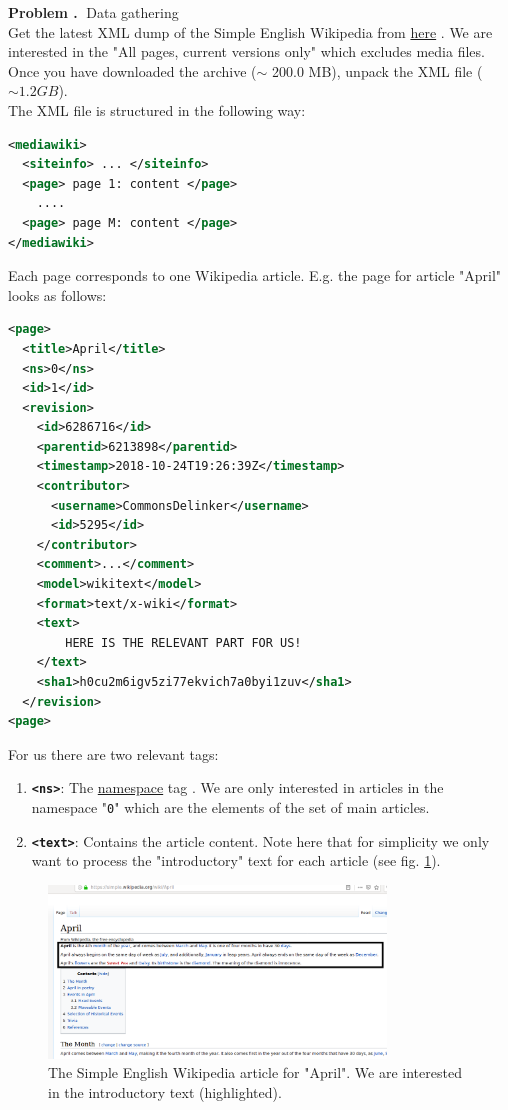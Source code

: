 \documentclass[10pt]{article}
\newcounter{problemCounter}
\newenvironment{problem}[1]
{
	\vspace{0.5cm}
	\refstepcounter{problemCounter}\label{#1}
	\noindent \textbf{Problem \theproblemCounter.$\;$}
}{}
\begin{document}
\begin{problem}
	DData gathering \\
	Get the latest XML dump of the Simple English Wikipedia from  \href{https://dumps.wikimedia.org/simplewiki/20181120/}{here} \cite{url:sew-dump}. We are interested in the "All pages, current versions only" which excludes media files. Once you have downloaded the archive ($\sim$ 200.0 MB), unpack the XML file ($\sim 1.2 GB$).
\end{problem} \\
The XML file is structured in the following way:
\begin{lstlisting}[language=XML]
<mediawiki>
  <siteinfo> ... </siteinfo>
  <page> page 1: content </page>
    ....
  <page> page M: content </page>
</mediawiki>
\end{lstlisting}
Each page corresponds to one Wikipedia article. E.g. the page for article "April" looks as follows:
\begin{lstlisting}[language=XML]
<page>
  <title>April</title>
  <ns>0</ns>
  <id>1</id>
  <revision>
    <id>6286716</id>
    <parentid>6213898</parentid>
    <timestamp>2018-10-24T19:26:39Z</timestamp>
    <contributor>
      <username>CommonsDelinker</username>
      <id>5295</id>
    </contributor>
    <comment>...</comment>
    <model>wikitext</model>
    <format>text/x-wiki</format>
    <text>
        HERE IS THE RELEVANT PART FOR US!
    </text>
    <sha1>h0cu2m6igv5zi77ekvich7a0byi1zuv</sha1>
  </revision>
<page>
\end{lstlisting}
For us there are two relevant tags:
\begin{enumerate}
  \item \textbf{\texttt{\color{codeGray}<\color{MidnightBlue}ns\color{codeGray}>}}: The \href{https://en.wikipedia.org/wiki/Wikipedia:Namespace}{namespace} tag \cite{url:wiki-ns}. We are only interested in articles in the namespace "\texttt{0}" which are the elements of the set of main articles.
  \item \textbf{\texttt{\color{codeGray}<\color{MidnightBlue}text\color{codeGray}>}}: Contains the article content. Note here that for simplicity we only want to process the "introductory" text for each article (see fig. \ref{fig:article_intro}).
\end{enumerate}

\begin{figure}
  \center
	\includegraphics[width=0.8\textwidth]{article_intro.png}
  \caption{The Simple English Wikipedia article for "April". We are interested in the introductory text (highlighted).}
	\label{fig:article_intro}
\end{figure}
\end{document}
